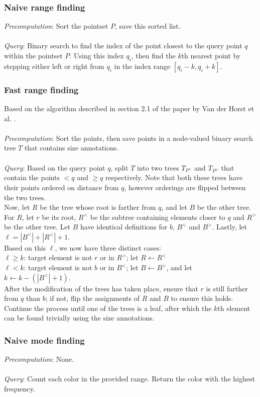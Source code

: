 \documentclass{article}
\begin{document}
\subsubsection{Naive range finding}
\textit{Precomputation}: Sort the pointset $P$, save this sorted list. \\\\
\textit{Query}: Binary search to find the index of the point closest to the query point $q$ within the pointset $P$. Using this index $q_i$, then find the $k$th nearest point by stepping either left or right from $q_i$ in the index range $[q_i-k, q_i+k]$. 
\subsubsection{Fast range finding}
Based on the algorithm described in section 2.1 of the paper by Van der Horst et al. \cite{Chan2014}. \\\\
\textit{Precomputation}: Sort the points, then save points in a node-valued binary search tree $T$ that contains size annotations. \\\\
\textit{Query}: Based on the query point $q$, split $T$ into two trees $T_{P^<}$ and $T_{P^{\geq}}$ that contain the points $< q$ and $\geq q$ respectively. Note that both these trees have their points ordered on distance from $q$, however orderings are flipped between the two trees. \\
Now, let $R$ be the tree whose root is farther from $q$, and let $B$ be the other tree. For $R$, let $r$ be its root, $R^<$ be the subtree containing elements closer to $q$ and $R^>$ be the other tree. Let $B$ have identical definitions for $b$, $B^<$ and $B^>$. Lastly, let $\ell = |B^<| + |R^<| + 1$. \\
Based on this $\ell$, we now have three distinct cases: \\ 
$\ell \geq k$: target element is not $r$ or in $R^>$; let $R \leftarrow R^<$\\
$\ell < k$: target element is not $b$ or in $B^<$; let $B \leftarrow B^>$, and let $k \leftarrow k - (|B^<| + 1)$. \\
After the modification of the trees has taken place, ensure that $r$ is still farther from $q$ than $b$; if not, flip the assignments of $R$ and $B$ to ensure this holds. Continue the process until one of the trees is a leaf, after which the $k$th element can be found trivially using the size annotations.
\subsubsection{Naive mode finding}
\textit{Precomputation}: None. \\\\
\textit{Query}: Count each color in the provided range. Return the color with the highest frequency.
\end{document}
